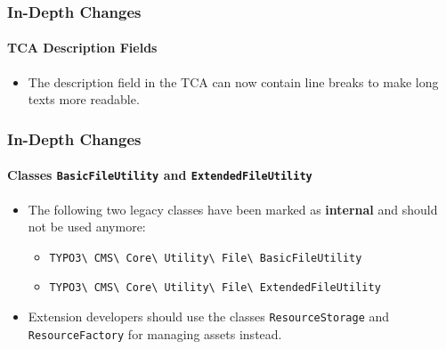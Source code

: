 
\begin{frame}[fragile]
	\frametitle{In-Depth Changes}
	\framesubtitle{TCA Description Fields}

	\begin{itemize}
		\item The description field in the TCA can now contain line breaks to make long texts more readable.
	\end{itemize}

\end{frame}


\begin{frame}[fragile]
	\frametitle{In-Depth Changes}
	\framesubtitle{Classes \texttt{BasicFileUtility} and \texttt{ExtendedFileUtility}}

	\begin{itemize}
		\item The following two legacy classes have been marked as \textbf{internal}
			and should not be used anymore:

			\begin{itemize}\small
				\item \texttt{TYPO3\textbackslash
					CMS\textbackslash
					Core\textbackslash
					Utility\textbackslash
					File\textbackslash
					BasicFileUtility}
				\item \texttt{TYPO3\textbackslash
					CMS\textbackslash
					Core\textbackslash
					Utility\textbackslash
					File\textbackslash
					ExtendedFileUtility}
			\end{itemize}

		\item Extension developers should use the classes \texttt{ResourceStorage}
			and \texttt{ResourceFactory} for managing assets instead.

	\end{itemize}

\end{frame}


